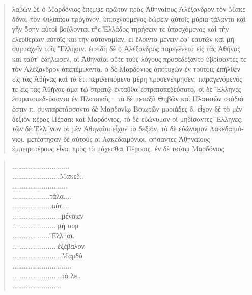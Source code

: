 \clearpage
\begin{multicols}{2}

\begin{quotation}
\footnotesize{\textgreek{λαβὼν δὲ ὁ Μαρδόνιος ἔπεμψε πρῶτον πρὸς Ἀθηναίους Ἀλέξανδρον τὸν Μακεδόνα, τὸν Φιλίππου πρόγονον, ὑπισχνούμενος δώσειν αὐτοῖς μύρια τάλαντα καὶ γῆν ὅσην αὐτοὶ βούλονται τῆς Ἑλλάδος τηρήσειν τε ὑποσχόμενος καὶ τὴν ἐλευθερίαν αὐτοῖς καὶ τὴν αὐτονομίαν, εἰ ἕλοιντο μένειν ἐφ’ ἑαυτῶν καὶ μὴ συμμαχεῖν τοῖς Ἕλλησιν. ἐπειδὴ δὲ ὁ Ἀλέξανδρος παρεγένετο εἰς τὰς Ἀθήνας καὶ ταῦτ’ ἐδήλωσεν, οἱ Ἀθηναῖοι οὔτε τοὺς λόγους προσεδέξαντο ὑβρίσαντές τε τὸν Ἀλέξανδρον ἀπεπέμψαντο. 
ὁ δὲ Μαρδόνιος ἀποτυχὼν ἐν τούτοις ἐπῆλθεν εἰς τὰς Ἀθήνας καὶ τὰ ἔτι περιλειπόμενα μέρη προσενέπρησεν, παραγενόμενός τε εἰς τὰς Ἀθήνας ἅμα τῷ στρατῷ ἐνταῦθα ἐστρατοπεδεύσατο, οἱ δὲ Ἕλληνες ἐστρατοπεδεύσαντο ἐν Πλαταιαῖς· τὰ δὲ μεταξὺ Θηβῶν καὶ Πλαταιῶν στάδιά ἐστιν π. συνπαρετάσσοντο δὲ Μαρδονίῳ Βοιωτῶν μυριάδες δ. 
    εἶχον δὲ τὸ μὲν δεξιὸν κέρας Πέρσαι καὶ Μαρδόνιος, τὸ δὲ εὐώνυμον οἱ μηδίσαντες Ἕλληνες. τῶν δὲ Ἑλλήνων οἱ μὲν Ἀθηναῖοι εἶχον τὸ δεξιόν, τὸ δὲ εὐώνυμον Λακεδαιμόνιοι. μετέστησαν δὲ αὐτούς οἱ Λακεδαιμόνιοι, φήσαντες Ἀθηναίους ἐμπειροτέρους εἶναι πρὸς τὸ μάχεσθαι Πέρσαις. ἐν δὲ τούτῳ Μαρδόνιος
    }}
    \end{quotation}
    \columnbreak
    \begin{quotation}
    \footnotesize{\textgreek{
    \lbrk..........................\lbrk...\\
    \lbrk........................\rbrk Μακεδ\lbrk..\rbrk\\
    \lbrk........................\lbrk....\rbrk\\
    \lbrk................... τάλα\lbrk....\rbrk\\
    \lbrk.................... αὐτ\lbrk....\rbrk\\
    \lbrk.........................\rbrk μένοιεν\\
    \lbrk....................... μὴ συμ\\
    \lbrk...................\rbrk Ἕλλησι\lbrk.\rbrk\\
    \lbrk.......................\rbrk ἐξέβαλον \\
    \lbrk......................... Μαρδό\\
    \lbrk..............................\\
    \lbrk......................... τὰ λε\lbrk..\rbrk\\
    \lbrk.........................\\
}}
\end{quotation}
\end{multicols}
